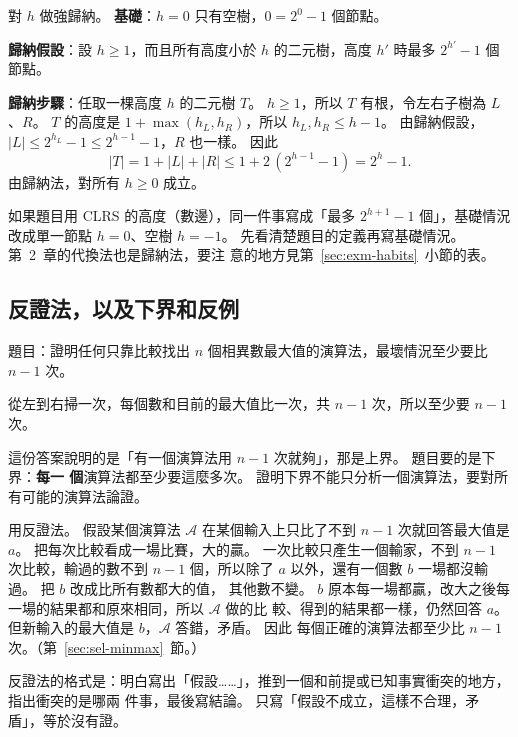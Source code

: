 \begin{exmgood}
對 $h$ 做強歸納。 \textbf{基礎}：$h = 0$ 只有空樹，$0 = 2^0 - 1$ 個節點。

\textbf{歸納假設}：設 $h \ge 1$，而且所有高度小於 $h$ 的二元樹，高度 $h'$ 時最多
$2^{h'} - 1$ 個節點。

\textbf{歸納步驟}：任取一棵高度 $h$ 的二元樹 $T$。 $h \ge 1$，所以 $T$ 有根，令左右子樹為
$L$、$R$。 $T$ 的高度是 $1 + \max(h_L, h_R)$，所以 $h_L, h_R \le h - 1$。 由歸納假設，
$|L| \le 2^{h_L} - 1 \le 2^{h-1} - 1$，$R$ 也一樣。 因此
\[
|T| = 1 + |L| + |R| \le 1 + 2\,(2^{h-1} - 1) = 2^h - 1.
\]
由歸納法，對所有 $h \ge 0$ 成立。
\end{exmgood}

如果題目用 CLRS 的高度（數邊），同一件事寫成「最多 $2^{h+1} - 1$ 個」，基礎情況改成單一節點
$h = 0$、空樹 $h = -1$。 先看清楚題目的定義再寫基礎情況。 第~2~章的代換法也是歸納法，要注
意的地方見第~\ref{sec:exm-habits}~小節的表。

\subsection{反證法，以及下界和反例}

題目：證明任何只靠比較找出 $n$ 個相異數最大值的演算法，最壞情況至少要比 $n - 1$ 次。

\begin{exmbad}
從左到右掃一次，每個數和目前的最大值比一次，共 $n - 1$ 次，所以至少要 $n - 1$ 次。
\end{exmbad}

這份答案說明的是「有一個演算法用 $n - 1$ 次就夠」，那是上界。 題目要的是下界：\textbf{每一
個}演算法都至少要這麼多次。 證明下界不能只分析一個演算法，要對所有可能的演算法論證。

\begin{exmgood}
用反證法。 假設某個演算法 $\mathcal{A}$ 在某個輸入上只比了不到 $n - 1$ 次就回答最大值是 $a$。
把每次比較看成一場比賽，大的贏。 一次比較只產生一個輸家，不到 $n - 1$ 次比較，輸過的數不到
$n - 1$ 個，所以除了 $a$ 以外，還有一個數 $b$ 一場都沒輸過。 把 $b$ 改成比所有數都大的值，
其他數不變。 $b$ 原本每一場都贏，改大之後每一場的結果都和原來相同，所以 $\mathcal{A}$ 做的比
較、得到的結果都一樣，仍然回答 $a$。 但新輸入的最大值是 $b$，$\mathcal{A}$ 答錯，矛盾。 因此
每個正確的演算法都至少比 $n - 1$ 次。（第~\ref{sec:sel-minmax}~節。）
\end{exmgood}

反證法的格式是：明白寫出「假設……」，推到一個和前提或已知事實衝突的地方，指出衝突的是哪兩
件事，最後寫結論。 只寫「假設不成立，這樣不合理，矛盾」，等於沒有證。

